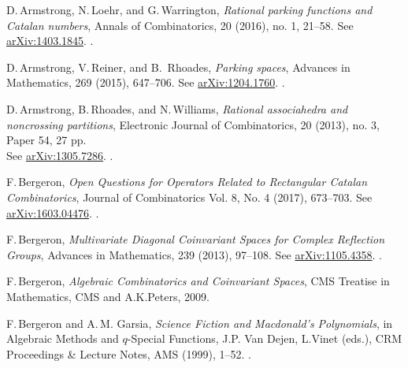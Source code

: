 \documentclass[12pt]{amsart}
\theoremstyle{plain}
\theoremstyle{definition}
\theoremstyle{remark}
\begin{document}

%  
%

 
\def\auteur#1{{\sc #1}}
\def\titreref#1{{\em #1}}
\def\vol#1{{\bf #1}}

\renewcommand{\refname}{{References}}
\begin{thebibliography}{10}  

\auteur{D.\,Armstrong, N.\,Loehr, and G.\,Warrington},
\titreref{Rational parking functions and Catalan numbers},
Annals of Combinatorics, 20 (2016), no. 1, 21--58. 
See \href{http://arxiv.org/abs/1403.1845}{arXiv:1403.1845}. . 
 
\auteur{D.\,Armstrong, V.\,Reiner, and B.~Rhoades},
\titreref{Parking spaces},
Advances in Mathematics, 269 (2015), 647--706. 
See \href{http://arxiv.org/abs/1204.1760}{arXiv:1204.1760}. .

\auteur{D.\,Armstrong, B.\,Rhoades, and N.\,Williams},
\titreref{Rational associahedra and noncrossing partitions},
Electronic Journal of Combinatorics,  20 (2013), no. 3, Paper 54, 27 pp. \\
   See \href{http://arxiv.org/abs/1305.7286}{arXiv:1305.7286}. .

\auteur{F.\,Bergeron},
\titreref{Open Questions for Operators Related to Rectangular Catalan Combinatorics},  
Journal of Combinatorics  Vol. 8, No. 4 (2017),   673--703. 
See \href{http://arxiv.org/abs/1603.04476}{arXiv:1603.04476}. .


\auteur{F.\,Bergeron},
\titreref{Multivariate Diagonal Coinvariant Spaces for Complex Reflection Groups}, 
Advances in Mathematics, 239 (2013), 97--108. 
See \href{http://arxiv.org/abs/1105.4358}{arXiv:1105.4358}. .

\auteur{F.\,Bergeron},
\titreref{Algebraic Combinatorics and Coinvariant Spaces}, 
CMS Treatise in Mathematics, CMS and A.K.Peters,  2009.

\auteur{F.\,Bergeron and A.\,M. Garsia},
\titreref{Science Fiction and Macdonald's Polynomials}, 
in Algebraic Methods and $q$-Special Functions, J.P. Van Dejen, L.Vinet (eds.), 
CRM Proceedings \& Lecture Notes, AMS (1999), 1--52. .


\end{thebibliography}
\end{document}
